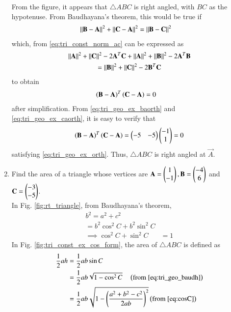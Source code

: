 \begin{enumerate}[label=\arabic*.,ref=\thesubsection.\theenumi]
\begin{figure}[!ht]
\caption{}
\label{fig:check_tri}
\end{figure}
%
From the figure, it appears that $\triangle ABC$ is right angled, with $BC$ as the hypotenuse.  From Baudhayana's theorem, this would be true if 
\begin{align}
\left\lVert\mathbf{B}-\mathbf{A}\right\rVert^2+\left\lVert\mathbf{C}-\mathbf{A}\right\rVert^2&=\left\lVert\mathbf{B}-\mathbf{C}\right\rVert^2
\end{align}
which, from \eqref{eq:tri_const_norm_ac} can be expressed as
\begin{multline}
\left\lVert\mathbf{A}\right\rVert^2 + \left\lVert\mathbf{C}\right\rVert^2 - 2\mathbf{A}^T\mathbf{C}+
\left\lVert\mathbf{A}\right\rVert^2 + \left\lVert\mathbf{B}\right\rVert^2 - 2\mathbf{A}^T\mathbf{B}
\\
=
\left\lVert\mathbf{B}\right\rVert^2 + \left\lVert\mathbf{C}\right\rVert^2 - 2\mathbf{B}^T\mathbf{C}
\end{multline}
%
to obtain 
\begin{align}
\label{eq:tri_geo_ex_orth}
\left(\mathbf{B}-\mathbf{A}\right)^T\left(\mathbf{C}-\mathbf{A}\right)&=0
\end{align}
%
after simplification.  From \eqref{eq:tri_geo_ex_baorth} and \eqref{eq:tri_geo_ex_caorth}, it is easy to verify that 
\begin{align}
\label{eq:tri_geo_ex_orth_sol}
\left(\mathbf{B}-\mathbf{A}\right)^T\left(\mathbf{C}-\mathbf{A}\right)=
 \begin{pmatrix}-5 & -5\end{pmatrix}\begin{pmatrix}-1\\1\end{pmatrix} = 0
\end{align}
satisfying
\eqref{eq:tri_geo_ex_orth}. Thus,  $\triangle ABC$ is right angled at $\vec{A}$.
%
\item Find the area of a triangle whose vertices are 
$\mathbf{A}=\begin{pmatrix}1\\-1\end{pmatrix}, 
\mathbf{B} = \begin{pmatrix}-4\\6\end{pmatrix}$ and
$ 
\mathbf{C} = \begin{pmatrix}-3\\-5\end{pmatrix}
$.
%
\\
\solution In Fig. \ref{fig:rt_triangle}, from Baudhayana's theorem, 
\begin{align}
\label{eq:tri_geo_baudh}
b^2 = a^2+c^2 &
\\
=b^2\cos^2C+b^2\sin^2C &
\\
\implies \cos^2C+\sin^2C &= 1
\end{align}
%
In Fig. \ref{fig:tri_const_ex_cos_form}, the area of $\triangle ABC$ is defined as
{\footnotesize
\begin{align}
\label{eq:tri_geo_area_sin_form}
\frac{1}{2}ah &= \frac{1}{2}ab\sin C
\\
&=\frac{1}{2}ab\sqrt{1-\cos^2C} \quad \left(\text{from } \eqref{eq:tri_geo_baudh}
\right)
\\
&=\frac{1}{2}ab\sqrt{1-\left(\frac{a^2+b^2-c^2}{2ab}\right)^2} \left(\text{from } \eqref{eq:cosC}
\right)
\end{align}}
\end{enumerate}
